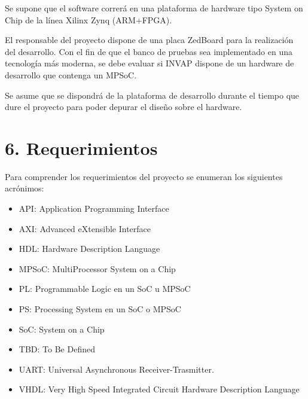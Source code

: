 \documentclass[
11pt, %
]{charter}
\begin{document}
Se supone que el software correrá en una plataforma de hardware tipo System on Chip de la línea Xilinx Zynq (ARM+FPGA).

El responsable del proyecto dispone de una placa ZedBoard para la realización del desarrollo. Con el fin de que el banco de pruebas sea implementado en una tecnología más moderna, se debe evaluar si INVAP dispone de un hardware de desarrollo que contenga un MPSoC.

Se asume que se dispondrá de la plataforma de desarrollo durante el tiempo que dure el proyecto para poder depurar el diseño sobre el hardware.

\section{6. Requerimientos}
\label{sec:requerimientos}

Para comprender los requerimientos del proyecto se enumeran los siguientes acrónimos:

\begin{itemize}
		\item API: Application Programming Interface
		\item AXI: Advanced eXtensible Interface
		\item HDL: Hardware Description Language
		\item MPSoC: MultiProcessor System on a Chip
		\item PL: Programmable Logic en un SoC u MPSoC
		\item PS: Processing System en un SoC o MPSoC
		\item SoC: System on a Chip
		\item TBD: To Be Defined
		\item UART: Universal Asynchronous Receiver-Trasmitter.
		\item VHDL: Very High Speed Integrated Circuit Hardware Description Language
\end{itemize}
\end{document}
